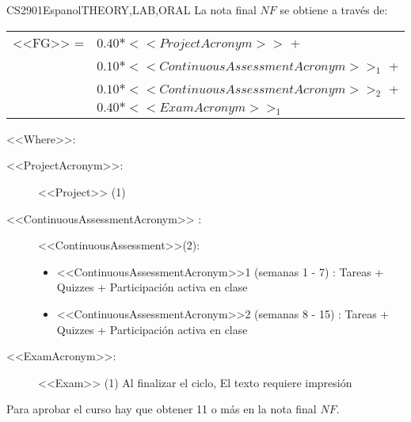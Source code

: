   \begin{evaluation}{CS2901}{Espanol}{THEORY,LAB,ORAL}
  La nota final $NF$ se obtiene a través de:
 
  \begin{tabular}{cl}
      <<FG>> = & $0.40*<<ProjectAcronym>>$ + \\
               & $0.10*<<ContinuousAssessmentAcronym>>_{1}$ + \\
               & $0.10*<<ContinuousAssessmentAcronym>>_{2}$ +  \\
               & $0.40*<<ExamAcronym>>_{1}$
  \end{tabular}
 
  \noindent <<Where>>:
  \begin{description}
     \item[<<ProjectAcronym>>:] <<Project>> (1)
     \item[<<ContinuousAssessmentAcronym>> :] <<ContinuousAssessment>>(2):
      \begin{itemize}
            \item <<ContinuousAssessmentAcronym>>1 (semanas 1 - 7) : Tareas + Quizzes + Participación activa en clase
             \item <<ContinuousAssessmentAcronym>>2 (semanas 8 - 15) : Tareas + Quizzes + Participación activa en clase
       \end{itemize}
     \item[<<ExamAcronym>>:] <<Exam>> (1) Al finalizar el ciclo, El texto requiere impresión
  \end{description}
 
  \noindent Para aprobar el curso hay que obtener 11 o más en la nota final $NF$.
  \end{evaluation}
 
